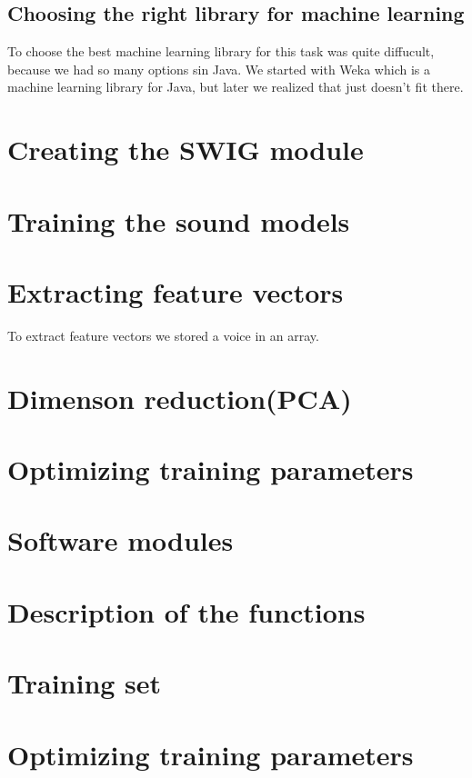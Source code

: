 \documentclass[english,12pt,oneside,a4paper]{article}
\begin{document}
\begin{center}
		\subsection{Choosing the right library for machine learning}
		To choose the best machine learning library for this task was quite diffucult, because we had so many options sin Java. We started with Weka which is a machine learning library for Java, but later we realized that just doesn't fit there.
		\section{Creating the SWIG module}
		
		\section{Training the sound models}
		
		\section{Extracting feature vectors}
		To extract feature vectors we stored a voice in an array. 
		\section{Dimenson reduction(PCA)}
		
		\section{Optimizing training parameters}
		
		\section{Software modules}
		
		\section{Description of the functions}
		
		\section{Training set}
		
		\section{Optimizing training parameters}
		

\end{center}
\end{document}
